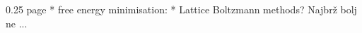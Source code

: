 \documentclass[a4paper,11pt]{article}
\begin{document}
0.25 page
* free energy minimisation: 
* Lattice Boltzmann methods? Najbrž bolj ne ... 
% 
%
%
%
%
%
%



\end{document}
